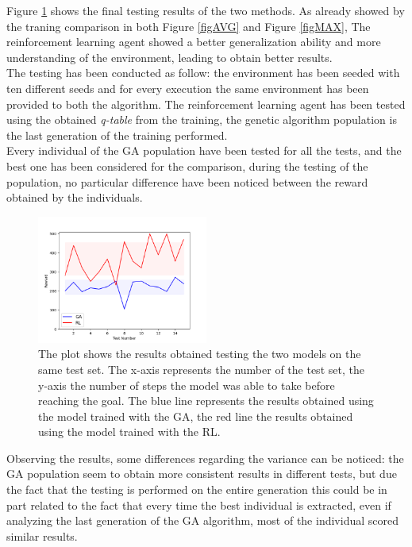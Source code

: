 Figure \ref{figRLvsGA} shows the final testing results of the two methods. As already showed by the traning comparison in both Figure \ref{figAVG} and Figure \ref{figMAX}, The reinforcement learning agent showed a better generalization ability and more understanding of the environment, leading to obtain better results.\\
The testing has been conducted as follow: the environment has been seeded with ten different seeds and for every execution the same environment has been provided to both the algorithm.
The reinforcement learning agent has been tested using the obtained \textit{q-table} from the training, the genetic algorithm population is the last generation of the training performed.\\
Every individual of the GA population have been tested for all the tests, and the best one has been considered for the comparison, during the testing of the population, no particular difference have been noticed between the reward obtained by the individuals.
\begin{figure}[H]
	\centering
	\includegraphics [width=0.5\textwidth]{Images/RL_vs_GA.png}
	\caption{The plot shows the results obtained testing the two models on the same test set. The x-axis represents the number of the test set, the y-axis the number of steps the model was able to take before reaching the goal. The blue line represents the results obtained using the model trained with the GA, the red line the results obtained using the model trained with the RL.}
	\label{figRLvsGA}
\end{figure}
Observing the results, some differences regarding the variance can be noticed: the GA population seem to obtain more consistent results in different tests, but due the fact that the testing is performed on the entire generation this could be in part related to the fact that every time the best individual is extracted, even if analyzing the last generation of the GA algorithm, most of the individual scored similar results.\\